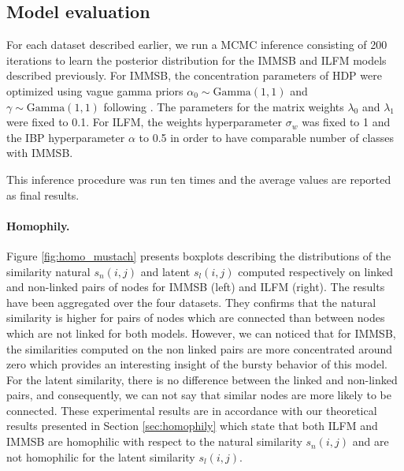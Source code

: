 \subsection{Model evaluation}
For each dataset described earlier, we run a MCMC inference consisting of 200 iterations to learn the posterior distribution for the IMMSB and ILFM  models described previously. For IMMSB, the concentration parameters of HDP were optimized  using vague gamma priors $\alpha_0 \sim \text{Gamma}(1,1)$ and $\gamma \sim \text{Gamma}(1,1)$ following \cite{HDP}. The parameters for the matrix weights  $\lambda_0$ and $\lambda_1$ were fixed to 0.1. For ILFM, the weights hyperparameter  $\sigma_w$ was fixed to 1 and the IBP hyperparameter $\alpha$ to 0.5 in order to  have comparable number of classes with IMMSB.

This inference procedure was run ten times and the average values are reported as final results.


\paragraph{Homophily.} Figure \ref{fig:homo_mustach} presents boxplots describing the distributions of the similarity natural $s_n(i,j)$ and latent $s_l(i,j)$ computed respectively on linked and non-linked pairs of nodes for IMMSB (left) and ILFM (right). The results have been aggregated over the four datasets.  They confirms that the natural similarity is  higher for  pairs of nodes which are connected than between nodes which are not linked for both models. However, we can noticed that for IMMSB, the similarities computed on the non linked pairs are more concentrated around zero which provides an interesting insight of the bursty behavior of this model. For the latent similarity,  there is no difference between the linked and non-linked pairs, and consequently, we can not say that similar nodes are more likely to be connected. These experimental results are in accordance with our theoretical results presented in Section \ref{sec:homophily} which state that both ILFM and IMMSB are homophilic with respect to the natural similarity $s_n(i,j)$ and are not homophilic for the latent similarity $s_l(i,j)$.

